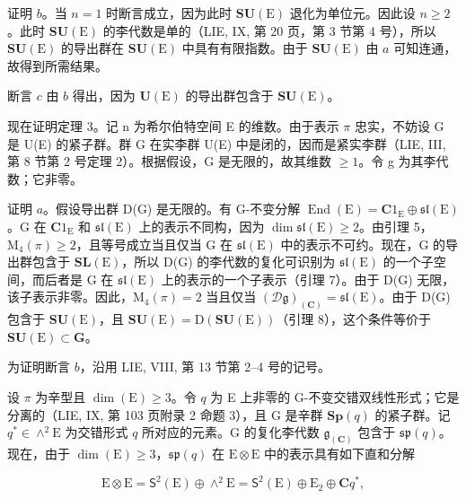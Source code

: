 证明 \(b\)。当 \(n = 1\) 时断言成立，因为此时 \(\mathbf{SU}(\mathrm{E})\) 退化为单位元。因此设 \(n \geqslant 2\)。此时 \(\mathbf{SU}(\mathrm{E})\) 的李代数是单的（LIE, IX, 第 20 页，第 3 节第 4 号），所以 \(\mathbf{SU}(\mathrm{E})\) 的导出群在 \(\mathbf{SU}(\mathrm{E})\) 中具有有限指数。由于 \(\mathbf{SU}(\mathrm{E})\) 由 \(a\) 可知连通，故得到所需结果。

断言 \(c\) 由 \(b\) 得出，因为 \(\mathbf{U}(\mathrm{E})\) 的导出群包含于 \(\mathbf{SU}(\mathrm{E})\)。

现在证明定理 3。记 n 为希尔伯特空间 E 的维数。由于表示 \(\pi\) 忠实，不妨设 G 是 U(E) 的紧子群。群 G 在实李群 U(E) 中是闭的，因而是紧实李群（LIE, III, 第 8 节第 2 号定理 2）。根据假设，G 是无限的，故其维数 \(\geqslant 1\)。令 g 为其李代数；它非零。

证明 \(a\)。假设导出群 D(G) 是无限的。有 G-不变分解 \(\operatorname{End}(\mathrm{E}) = \mathbf{C}1_{\mathrm{E}} \oplus \mathfrak{sl}(\mathrm{E})\)。G 在 \(\mathbf{C}1_{\mathrm{E}}\) 和 \(\mathfrak{sl}(\mathrm{E})\) 上的表示不同构，因为 \(\dim \mathfrak{sl}(\mathrm{E}) \geqslant 2\)。由引理 5，\(\mathrm{M}_4(\pi) \geqslant 2\)，且等号成立当且仅当 G 在 \(\mathfrak{sl}(\mathrm{E})\) 中的表示不可约。现在，G 的导出群包含于 \(\mathbf{SL}(\mathrm{E})\)，所以 D(G) 的李代数的复化可识别为 \(\mathfrak{sl}(\mathrm{E})\) 的一个子空间，而后者是 G 在 \(\mathfrak{sl}(\mathrm{E})\) 上的表示的一个子表示（引理 7）。由于 D(G) 无限，该子表示非零。因此，\(\mathrm{M}_4(\pi) = 2\) 当且仅当 \((\mathcal{D}\mathfrak{g})_{(\mathbf{C})} = \mathfrak{sl}(\mathrm{E})\)。由于 D(G) 包含于 \(\mathbf{SU}(\mathrm{E})\)，且 \(\mathbf{SU}(\mathrm{E}) = \mathrm{D}(\mathbf{SU}(\mathrm{E}))\)（引理 8），这个条件等价于 \(\mathbf{SU}(\mathrm{E}) \subset \mathbf{G}\)。

为证明断言 \(b\)，沿用 LIE, VIII, 第 13 节第 2--4 号的记号。

设 \(\pi\) 为辛型且 \(\dim(\mathrm{E}) \geqslant 3\)。令 \(q\) 为 E 上非零的 G-不变交错双线性形式；它是分离的（LIE, IX, 第 103 页附录 2 命题 3），且 G 是辛群 \(\mathbf{Sp}(q)\) 的紧子群。记 \(q^{*} \in \wedge^{2}\mathrm{E}\) 为交错形式 \(q\) 所对应的元素。G 的复化李代数 \(\mathfrak{g}_{(\mathbf{C})}\) 包含于 \(\mathfrak{sp}(q)\)。现在，由于 \(\dim(\mathrm{E}) \geqslant 3\)，\(\mathfrak{sp}(q)\) 在 \(\mathrm{E} \otimes \mathrm{E}\) 中的表示具有如下直和分解

\[
\mathrm{E} \otimes \mathrm{E} = \mathsf {S} ^ {2} (\mathrm{E}) \oplus \wedge^ {2} \mathrm{E} = \mathsf {S} ^ {2} (\mathrm{E}) \oplus \mathrm{E} _ {2} \oplus \mathbf {C} q ^ {*},
\]

